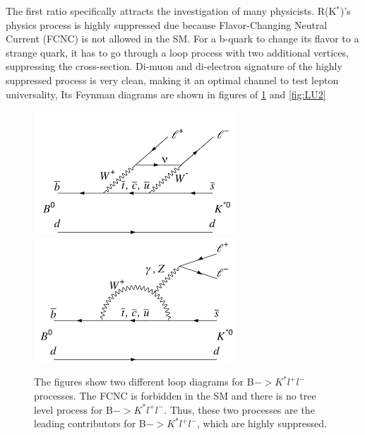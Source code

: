 The first ratio specifically attracts the investigation of many physicists.
R(K$^{*}$)'s physics process is highly suppressed due because Flavor-Changing Neutral Current (FCNC) is not allowed in the SM.
For a b-quark to change its flavor to a strange quark, it has to go through a loop process with two additional vertices, suppressing the cross-section.
Di-muon and di-electron signature of the highly suppressed process is very clean, making it an optimal channel to test lepton universality,
Its Feynman diagrams are shown in figures of \ref{fig:LU1} and \ref{fig:LU2}
\begin{figure}[h!]
  \caption{The figures show two different loop diagrams for B$->K^{*}l^{+}l^{-}$ processes. The FCNC is forbidden in the SM and there is no tree level process for B$->K^{*}l^{+}l^{-}$. Thus, these two processes are the leading contributors for B$->K^{*}l^{+}l^{-}$, which are highly suppressed.}
  \label{fig:LU1}
  \centering
  \includegraphics[width=0.57\linewidth]{figs/LU3.png}
  \includegraphics[width=0.57\linewidth]{figs/LU1.png}
\end{figure}
